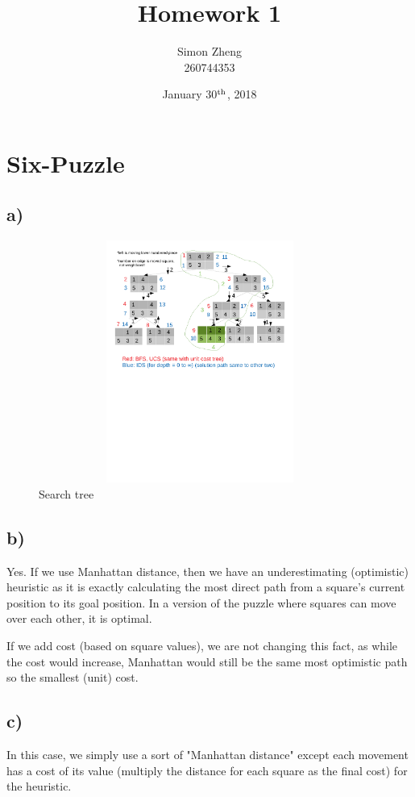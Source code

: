 \documentclass[11pt,letterpaper]{article}
\author{Simon Zheng\\260744353}
\title{Homework 1}
\date{January 30$^{\textnormal{th}}$, 2018}
\begin{document}
	\maketitle
	\thispagestyle{fancy}
	
	\section{Six-Puzzle}
		\subsection{a)}
		\begin{figure}[ht]
			\centering
			\includegraphics[height=300px,width=400px,trim={0 360px 0 0},clip]{q1.pdf}
			\linespread{0.8}\caption{Search tree}
		\end{figure}
		
		\subsection{b)}
		Yes.
		If we use Manhattan distance, then we have an underestimating (optimistic) heuristic as it is exactly calculating the most direct path from a square's current position to its goal position.
		In a version of the puzzle where squares can move over each other, it is optimal.
		
		If we add cost (based on square values), we are not changing this fact, as while the cost would increase, Manhattan would still be the same most optimistic path so the smallest (unit) cost.
		
		\subsection{c)}
		In this case, we simply use a sort of "Manhattan distance" except each movement has a cost of its value (multiply the distance for each square as the final cost) for the heuristic.
		
\end{document}
